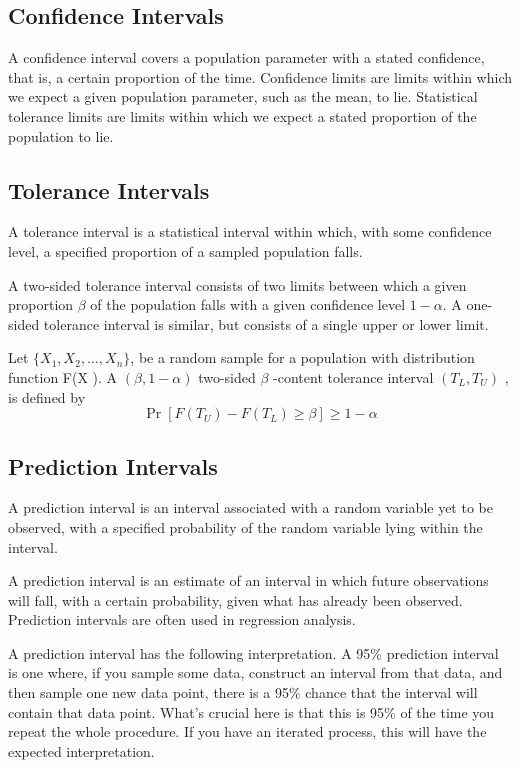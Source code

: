 \documentclass[]{report}
\begin{document}
\subsection{Confidence Intervals}
A confidence interval covers a population parameter with a stated confidence, that is, a certain proportion of the time.
Confidence limits are limits within which we expect a given population parameter, such as the mean, to lie. Statistical tolerance limits are limits within which we expect a stated proportion of the population to lie.

\subsection{Tolerance Intervals}
A tolerance interval is a statistical interval within which, with some confidence level, a specified proportion of a sampled population falls.

A two-sided tolerance interval consists of two limits between which a given proportion $\beta$ of the population falls with a given confidence
level $1−\alpha$. A one-sided tolerance interval is similar, but consists of a single upper or lower limit.


Let $\{X_1, X_2, \ldots , X_n  \}$, be a random sample for a population with distribution function F(X ). A $(\beta,1−\alpha)$ two-sided
$\beta$ -content tolerance interval $(T_L, T_U ) $ , is defined by
\[ \Pr[F(T_U ) - F(T_L ) \geq \beta ] ≥ 1−\alpha\]


\subsection{Prediction Intervals}
A prediction interval is an interval associated with a random variable yet to be observed, with a specified probability of the random variable lying within the interval. 

A prediction interval is an estimate of an interval in which future observations will fall, with a certain probability, given what has already been observed. Prediction intervals are often used in regression analysis.

A prediction interval has the following interpretation. A 95\% prediction interval is one where, if you sample some data, construct an interval from that data, and then sample one new data point, there is a 95\% chance that the interval will contain that data point. What's crucial here is that this is 95\% of the time you repeat the whole procedure. 
If you have an iterated process, this will have the expected interpretation. 


\end{document}
